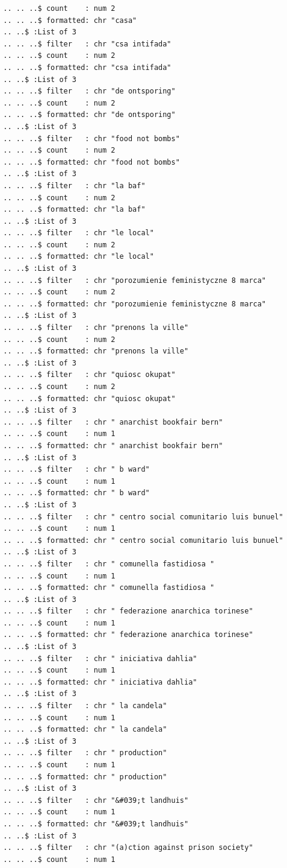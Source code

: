 \documentclass[
  letterpaper,
  DIV=11,
  numbers=noendperiod]{scrartcl}
\begin{document}
\begin{verbatim}
  .. .. ..$ count    : num 2
  .. .. ..$ formatted: chr "casa"
  .. ..$ :List of 3
  .. .. ..$ filter   : chr "csa intifada"
  .. .. ..$ count    : num 2
  .. .. ..$ formatted: chr "csa intifada"
  .. ..$ :List of 3
  .. .. ..$ filter   : chr "de ontsporing"
  .. .. ..$ count    : num 2
  .. .. ..$ formatted: chr "de ontsporing"
  .. ..$ :List of 3
  .. .. ..$ filter   : chr "food not bombs"
  .. .. ..$ count    : num 2
  .. .. ..$ formatted: chr "food not bombs"
  .. ..$ :List of 3
  .. .. ..$ filter   : chr "la baf"
  .. .. ..$ count    : num 2
  .. .. ..$ formatted: chr "la baf"
  .. ..$ :List of 3
  .. .. ..$ filter   : chr "le local"
  .. .. ..$ count    : num 2
  .. .. ..$ formatted: chr "le local"
  .. ..$ :List of 3
  .. .. ..$ filter   : chr "porozumienie feministyczne 8 marca"
  .. .. ..$ count    : num 2
  .. .. ..$ formatted: chr "porozumienie feministyczne 8 marca"
  .. ..$ :List of 3
  .. .. ..$ filter   : chr "prenons la ville"
  .. .. ..$ count    : num 2
  .. .. ..$ formatted: chr "prenons la ville"
  .. ..$ :List of 3
  .. .. ..$ filter   : chr "quiosc okupat"
  .. .. ..$ count    : num 2
  .. .. ..$ formatted: chr "quiosc okupat"
  .. ..$ :List of 3
  .. .. ..$ filter   : chr " anarchist bookfair bern"
  .. .. ..$ count    : num 1
  .. .. ..$ formatted: chr " anarchist bookfair bern"
  .. ..$ :List of 3
  .. .. ..$ filter   : chr " b ward"
  .. .. ..$ count    : num 1
  .. .. ..$ formatted: chr " b ward"
  .. ..$ :List of 3
  .. .. ..$ filter   : chr " centro social comunitario luis bunuel"
  .. .. ..$ count    : num 1
  .. .. ..$ formatted: chr " centro social comunitario luis bunuel"
  .. ..$ :List of 3
  .. .. ..$ filter   : chr " comunella fastidiosa "
  .. .. ..$ count    : num 1
  .. .. ..$ formatted: chr " comunella fastidiosa "
  .. ..$ :List of 3
  .. .. ..$ filter   : chr " federazione anarchica torinese"
  .. .. ..$ count    : num 1
  .. .. ..$ formatted: chr " federazione anarchica torinese"
  .. ..$ :List of 3
  .. .. ..$ filter   : chr " iniciativa dahlia"
  .. .. ..$ count    : num 1
  .. .. ..$ formatted: chr " iniciativa dahlia"
  .. ..$ :List of 3
  .. .. ..$ filter   : chr " la candela"
  .. .. ..$ count    : num 1
  .. .. ..$ formatted: chr " la candela"
  .. ..$ :List of 3
  .. .. ..$ filter   : chr " production"
  .. .. ..$ count    : num 1
  .. .. ..$ formatted: chr " production"
  .. ..$ :List of 3
  .. .. ..$ filter   : chr "&#039;t landhuis"
  .. .. ..$ count    : num 1
  .. .. ..$ formatted: chr "&#039;t landhuis"
  .. ..$ :List of 3
  .. .. ..$ filter   : chr "(a)ction against prison society"
  .. .. ..$ count    : num 1

\end{verbatim}
\end{document}
